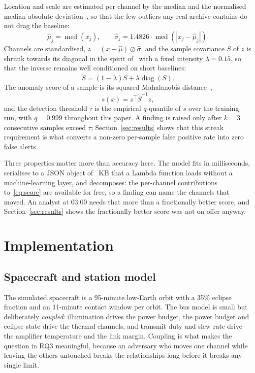 \documentclass[conference]{IEEEtran}
\begin{document}
Location and scale are estimated per channel by the median and the normalised
median absolute deviation~\cite{rousseeuw1993mad}, so that the few outliers any
real archive contains do not drag the baseline:
\begin{equation}
\hat{\mu}_j = \operatorname{med}(x_j), \qquad
\hat{\sigma}_j = 1.4826 \cdot \operatorname{med}\!\left(|x_j - \hat{\mu}_j|\right).
\end{equation}
Channels are standardised, $z = (x - \hat{\mu}) \oslash \hat{\sigma}$, and the
sample covariance $S$ of $z$ is shrunk towards its diagonal in the spirit
of~\cite{ledoit2004wellconditioned} with a fixed intensity $\lambda = 0.15$, so
that the inverse remains well conditioned on short baselines:
\begin{equation}
\tilde{S} = (1 - \lambda) S + \lambda \operatorname{diag}(S).
\end{equation}
The anomaly score of a sample is its squared Mahalanobis
distance~\cite{mahalanobis1936},
\begin{equation}
s(x) = z^{\top} \tilde{S}^{-1} z,
\label{eq:score}
\end{equation}
and the detection threshold $\tau$ is the empirical $q$-quantile of $s$ over the
training run, with $q = 0.999$ throughout this paper. A finding is raised only
after $k = 3$ consecutive samples exceed $\tau$; Section~\ref{sec:results} shows
that this streak requirement is what converts a non-zero per-sample false
positive rate into zero false alerts.

Three properties matter more than accuracy here. The model fits in milliseconds,
serialises to a JSON object of \expModelKb~KB that a Lambda function loads
without a machine-learning layer, and decomposes: the per-channel contributions
to~\eqref{eq:score} are available for free, so a finding can name the channels
that moved. An analyst at 03:00 needs that more than a fractionally better
score, and Section~\ref{sec:results} shows the fractionally better score was not
on offer anyway.

\section{Implementation}
\label{sec:impl}

\subsection{Spacecraft and station model}

The simulated spacecraft is a 95-minute low-Earth orbit with a 35\% eclipse
fraction and an 11-minute contact window per orbit. The bus model is small but
deliberately \emph{coupled}: illumination drives the power budget, the power
budget and eclipse state drive the thermal channels, and transmit duty and slew
rate drive the amplifier temperature and the link margin. Coupling is what
makes the question in RQ3 meaningful, because an adversary who moves one channel
while leaving the others untouched breaks the relationships long before it
breaks any single limit.
\end{document}
